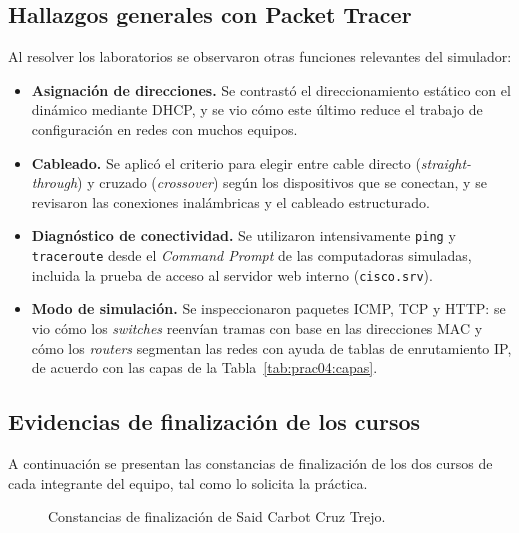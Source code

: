 \subsection{Hallazgos generales con Packet Tracer}
\label{sec:prac04:hallazgos}

Al resolver los laboratorios se observaron otras funciones relevantes del simulador:

\begin{itemize}
    \item \textbf{Asignación de direcciones.} Se contrastó el direccionamiento estático con el dinámico mediante DHCP, y se vio cómo este último reduce el trabajo de configuración en redes con muchos equipos.
    \item \textbf{Cableado.} Se aplicó el criterio para elegir entre cable directo (\emph{straight-through}) y cruzado (\emph{crossover}) según los dispositivos que se conectan, y se revisaron las conexiones inalámbricas y el cableado estructurado.
    \item \textbf{Diagnóstico de conectividad.} Se utilizaron intensivamente \texttt{ping} y \texttt{traceroute} desde el \emph{Command Prompt} de las computadoras simuladas, incluida la prueba de acceso al servidor web interno (\texttt{cisco.srv}).
    \item \textbf{Modo de simulación.} Se inspeccionaron paquetes ICMP, TCP y HTTP: se vio cómo los \emph{switches} reenvían tramas con base en las direcciones MAC y cómo los \emph{routers} segmentan las redes con ayuda de tablas de enrutamiento IP, de acuerdo con las capas de la Tabla~\ref{tab:prac04:capas}.
\end{itemize}

\subsection{Evidencias de finalización de los cursos}
\label{sec:prac04:evidencias}

A continuación se presentan las constancias de finalización de los dos cursos de cada integrante del equipo, tal como lo solicita la práctica.

\begin{figure}[H]
    \centering
    \hfill
    \caption{Constancias de finalización de Said Carbot Cruz Trejo.}
    \label{fig:prac04:cert:said}
\end{figure}

